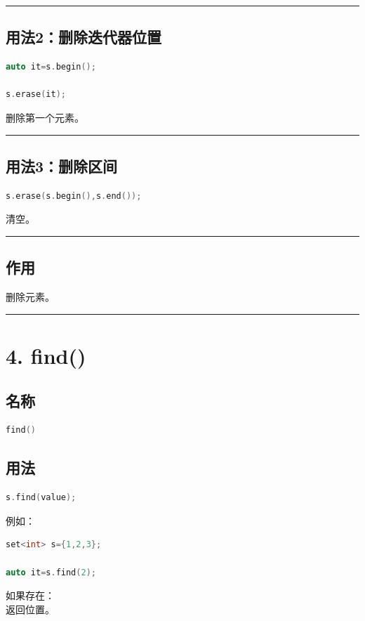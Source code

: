 \documentclass[10pt,twocolumn]{extarticle}
\begin{document}
\noindent\rule{\linewidth}{0.4pt}

\subsection{用法2：删除迭代器位置}
\begin{lstlisting}[language=C++]
auto it=s.begin();

s.erase(it);
\end{lstlisting}
删除第一个元素。

\noindent\rule{\linewidth}{0.4pt}

\subsection{用法3：删除区间}
\begin{lstlisting}[language=C++]
s.erase(s.begin(),s.end());
\end{lstlisting}
清空。

\noindent\rule{\linewidth}{0.4pt}

\subsection{作用}
删除元素。

\noindent\rule{\linewidth}{0.4pt}

\section{4. find()}

\subsection{名称}
\begin{lstlisting}[language=C++]
find()
\end{lstlisting}

\subsection{用法}
\begin{lstlisting}[language=C++]
s.find(value);
\end{lstlisting}
例如：
\begin{lstlisting}[language=C++]
set<int> s={1,2,3};

auto it=s.find(2);
\end{lstlisting}
如果存在：\\
返回位置。
\end{document}
